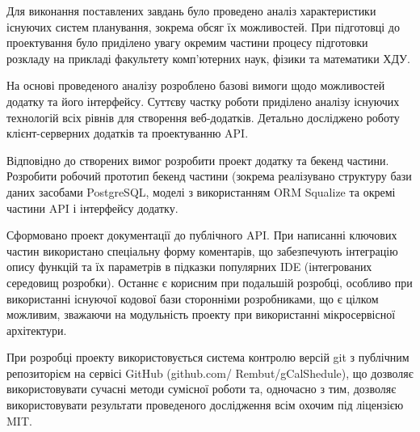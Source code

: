 
Для виконання поставлених завдань було проведено аналіз характеристики існуючих систем планування, зокрема обсяг їх можливостей. При підготовці до проектування було приділено увагу окремим частини процесу підготовки розкладу на прикладі факультету комп’ютерних наук, фізики та математики ХДУ.

На основі проведеного аналізу розроблено базові вимоги щодо можливостей додатку та його інтерфейсу.
Суттєву частку роботи приділено аналізу існуючих технологій всіх рівнів для створення веб-додатків. Детально досліджено роботу клієнт-серверних додатків та проектуванню API. 

Відповідно до створених вимог розробити проект додатку та бекенд частини. Розробити робочий прототип бекенд частини (зокрема реалізувано структуру бази даних засобами PostgreSQL, моделі з використанням ORM Squalize та окремі частини API і інтерфейсу додатку.

Сформовано проект документації до публічного API. При написанні ключових частин використано спеціальну форму коментарів, що забезпечують інтеграцію опису функцій та їх параметрів в підказки популярних IDE (інтегрованих середовищ розробки). Останнє є корисним при подальшій розробці, особливо при використанні існуючої кодової бази сторонніми розробниками, що є цілком можливим, зважаючи на модульність проекту при використанні мікросервісної архітектури.

При розробці проекту використовується система контролю версій git з публічним репозиторієм на сервісі GitHub (github.com/ Rembut/gCalShedule), що дозволяє використовувати сучасні методи сумісної роботи та, одночасно з тим, дозволяє використовувати результати проведеного дослідження всім охочим під ліцензією MIT.
